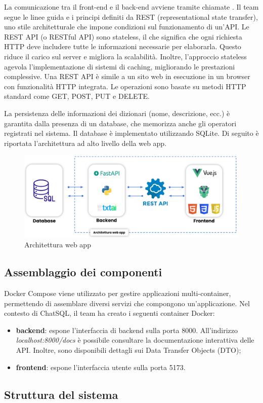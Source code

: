 \vspace{0.5\baselineskip}
\par La comunicazione tra il front-end e il back-end avviene tramite chiamate . Il team segue le linee guida e i principi definiti da REST (representational state transfer), uno stile architetturale che impone condizioni sul funzionamento di un'API. Le REST API (o RESTful API) sono stateless, il che significa che ogni richiesta HTTP deve includere tutte le informazioni necessarie per elaborarla. Questo riduce il carico sul server e migliora la scalabilità. Inoltre, l’approccio stateless agevola l'implementazione di sistemi di caching, migliorando le prestazioni complessive. Una REST API è simile a un sito web in esecuzione in un browser con funzionalità HTTP integrata. Le operazioni sono basate su metodi HTTP standard come GET, POST, PUT e DELETE.

\vspace{0.5\baselineskip}
\par La persistenza delle informazioni dei dizionari (nome, descrizione, ecc.) è garantita dalla presenza di un database, che memorizza anche gli operatori registrati nel sistema. Il database è implementato utilizzando SQLite. Di seguito è riportata l'architettura ad alto livello della web app.

\begin{figure}[H]
  \centering
  \includegraphics[width=\textwidth]{assets/architettura_web_app.pdf}
  \caption{Architettura web app}
\end{figure}

\subsection{Assemblaggio dei componenti}
\par Docker Compose viene utilizzato per gestire applicazioni multi-container, permettendo di assemblare diversi servizi che compongono un'applicazione. Nel contesto di ChatSQL, il team ha creato i seguenti container Docker:
\begin{itemize}
  \item \textbf{backend}: espone l'interfaccia di backend sulla porta 8000. All'indirizzo \textit{localhost:8000/docs} è possibile consultare la documentazione interattiva delle API. Inoltre, sono disponibili dettagli sui Data Transfer Objects (DTO);
  \item \textbf{frontend}: espone l'interfaccia utente sulla porta 5173.
\end{itemize}

\subsection{Struttura del sistema}




